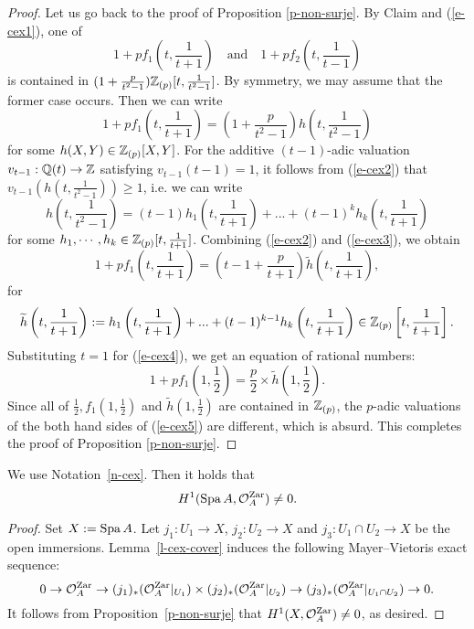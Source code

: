 \begin{proof}
Let us go back to the proof  of Proposition \ref{p-non-surje}. 
By Claim and (\ref{e-cex1}), one of 
$$1+pf_1\left(t, \frac{1}{t+1}\right)\quad \text{and}\quad 
1+pf_2\left(t, \frac{1}{t-1}\right)$$
is contained in $(1+\frac{p}{t^2-1})\mathbb{Z}_{(p)}[t, \frac{1}{t^2-1}]$. 
By symmetry, we may assume that the former case occurs. 
Then we can write 
\begin{equation}\label{e-cex2}
1+pf_1\left(t, \frac{1}{t+1}\right)=\left(1+\frac{p}{t^2-1}\right)
h\left(t, \frac{1}{t^2-1}\right)
\end{equation}
for some $h(X, Y) \in \mathbb{Z}_{(p)}[X, Y]$. 
For the additive $(t-1)$-adic valuation $v_{t-1}:\mathbb{Q}(t) \to \mathbb{Z}$ 
satisfying $v_{t-1}(t-1)=1$, 
it follows from (\ref{e-cex2}) that 
$v_{t-1}(h(t, \frac{1}{t^2-1}))\geq 1$, i.e. 
we can write 
\begin{equation}\label{e-cex3}
h\left(t, \frac{1}{t^2-1}\right)=(t-1)h_1\left(t, \frac{1}{t+1}\right)+...+(t-1)^kh_k\left(t, \frac{1}{t+1}\right)
\end{equation}
for some $h_1,\cdots, h_k \in \mathbb{Z}_{(p)}[t, \frac{1}{t+1}]$. 
Combining (\ref{e-cex2}) and (\ref{e-cex3}), we obtain 
\begin{equation}\label{e-cex4}
1+pf_1\left(t, \frac{1}{t+1}\right)=\left(t-1+\frac{p}{t+1}\right)
\widetilde{h}\left(t, \frac{1}{t+1}\right),
\end{equation}
for 
$$\widetilde{h}\left(t, \frac{1}{t+1}\right):=
h_1\left(t, \frac{1}{t+1}\right)+...+(t-1)^{k-1}h_k\left(t, \frac{1}{t+1}\right) 
\in \mathbb{Z}_{(p)}\left[t, \frac{1}{t+1}\right].$$
Substituting $t=1$ for (\ref{e-cex4}), 
we get an equation of rational numbers: 
\begin{equation}\label{e-cex5}
1+pf_1\left(1, \frac{1}{2}\right)=\frac{p}{2} \times 
\widetilde{h}\left(1, \frac{1}{2}\right).
\end{equation}
Since all of $\frac{1}{2}, f_1(1, \frac{1}{2})$ and 
$\widetilde{h}(1, \frac{1}{2})$ are contained in $\mathbb{Z}_{(p)}$, 
the $p$-adic valuations of the both hand sides of (\ref{e-cex5})
are different, which is absurd. 
This completes the proof of Proposition \ref{p-non-surje}.
\end{proof}
\begin{thm}\label{t-non-TA}
We use Notation~\ref{n-cex}. 
Then it holds that 
$$H^1({\operatorname{Spa}}\,A, \mathcal{O}_A^{{\operatorname{Zar}}}) \neq 0.$$ 
\end{thm}

\begin{proof}
Set $X:={\operatorname{Spa}}\,A$. 
Let $j_1:U_1 \to X$, $j_2:U_2 \to X$ and $j_3:U_1 \cap U_2 \to X$ 
be the open immersions. 
Lemma~\ref{l-cex-cover} induces the following Mayer--Vietoris exact sequence: 
$$0 \to \mathcal{O}^{{\operatorname{Zar}}}_A \to (j_1)_*(\mathcal{O}^{{\operatorname{Zar}}}_A|_{U_1})
\times (j_2)_*(\mathcal{O}^{{\operatorname{Zar}}}_A|_{U_2}) 
\to (j_3)_*(\mathcal{O}^{{\operatorname{Zar}}}_A|_{U_1 \cap U_2}) \to 0.$$
It follows from Proposition~\ref{p-non-surje} that  
$H^1(X, \mathcal{O}_A^{{\operatorname{Zar}}}) \neq 0$, as desired. 
\end{proof}




